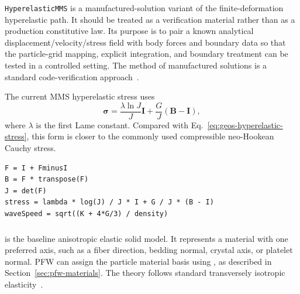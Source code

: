 \texttt{HyperelasticMMS} is a manufactured-solution variant of the finite-deformation hyperelastic path.  It should be treated as a verification material rather than as a production constitutive law.  Its purpose is to pair a known analytical displacement/velocity/stress field with body forces and boundary data so that the particle-grid mapping, explicit integration, and boundary treatment can be tested in a controlled setting.  The method of manufactured solutions is a standard code-verification approach~\cite{roache1998}.

The current MMS hyperelastic stress uses
\begin{equation}
  \boldsymbol{\sigma}
  = \frac{\lambda \ln J}{J}\mathbf{I}
  + \frac{G}{J}(\mathbf{B}-\mathbf{I}),
  \label{eq:hyperelastic-mms-stress}
\end{equation}
where \(\lambda\) is the first Lame constant.  Compared with Eq.~\eqref{eq:geos-hyperelastic-stress}, this form is closer to the commonly used compressible neo-Hookean Cauchy stress.

\begin{lstlisting}[caption={HyperelasticMMS stress update.},label={alg:hyperelastic-mms-update},basicstyle=\ttfamily\small]
F = I + FminusI
B = F * transpose(F)
J = det(F)
stress = lambda * log(J) / J * I + G / J * (B - I)
waveSpeed = sqrt((K + 4*G/3) / density)
\end{lstlisting}

\subsubsection{}
\label{subsubsec:elastic-transverse-isotropic-model}

 is the baseline anisotropic elastic solid model.  It represents a material with one preferred axis, such as a fiber direction, bedding normal, crystal axis, or platelet normal.  PFW can assign the particle material basis using , as described in Section~\ref{sec:pfw-materials}.  The theory follows standard transversely isotropic elasticity~\cite{lekhnitskii1963}.

